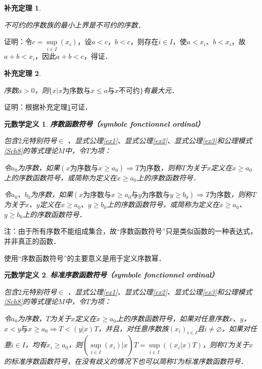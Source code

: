 \documentclass[12pt, a4paper, oneside]{book}
\newtheorem{metadef}{元数学定义}
\newtheorem{cor}{补充定理}
\begin{document}
			\begin{cor}\label{cor267}
				\hfill\par
				不可约的序数族的最小上界是不可约的序数．
			\end{cor}
			证明：令$c=\mathop{sup}\limits_{i\in I}(x_i)$，设$a<c$，$b<c$，则存在$i\in I$，使$a<x_i$、$b<x_i$，故$a+b<x_i$，因此$a+b<c$，得证．
			
			\begin{cor}\label{cor268}
				\hfill\par
				序数$a>0$，则$\{x|x\text{为序数}\text{与}x\leq a\text{与}x\text{不可约}\}$有最大元．
			\end{cor}
			证明：根据补充定理\ref{cor267}可证． 
									
			\begin{metadef}
				\textbf{序数函数符号（symbole fonctionnel ordinal）}
				\par
				包含$2$元特别符号$\in$ 、显式公理\ref{ex1}、显式公理\ref{ex2}、显式公理\ref{ex3}和公理模式\ref{Sch8}的等式理论$M$中，令$T$为项：
				\par
				令$a_0$为序数，如果$(x\text{为序数}\text{与}x\geq a_0)\Rightarrow T\text{为序数}$，则称$T$为关于$x$定义在$x\geq a_0$上的序数函数符号，或简称为定义在$x\geq a_0$上的序数函数符号．
				\par
				令$a_0$、$b_0$为序数，如果$(x\text{为序数}\text{与}x\geq a_0\text{与}y\text{为序数}\text{与}y\geq b_0)\Rightarrow T\text{为序数}$，则称$T$为关于$x$、$y$定义在$x\geq a_0$、$y\geq b_0$上的序数函数符号，或简称为定义在$x\geq a_0$、$y\geq b_0$上的序数函数符号．
			\end{metadef}
			注：由于所有序数不能组成集合，故“序数函数符号”只是类似函数的一种表达式，并非真正的函数．
			\par
			使用“序数函数符号”的主要意义是用于定义序数幂．
									
			\begin{metadef}
				\textbf{标准序数函数符号（symbole fonctionnel ordinal）}
				\par
				包含$2$元特别符号$\in$ 、显式公理\ref{ex1}、显式公理\ref{ex2}、显式公理\ref{ex3}和公理模式\ref{Sch8}的等式理论$M$中，令$T$为项：
				\par
				令$a_0$为序数，$T$为关于$x$定义在$x\geq a_0$上的序数函数符号，如果对任意序数$x$、$y$，$x<y\text{与}x\geq a_0\Rightarrow T<(y|x)T$，并且，对任意序数族$(x_i)_{i\in I}$且$i\neq \varnothing$，如果对任意$i\in I$，均有$x_i\geq a_0$，则$(\mathop{sup}\limits_{i\in I}(x_i)|x)T=\mathop{sup}\limits_{i\in I}((x_i|x)T)$，则称$T$为关于$x$的标准序数函数符号，在没有歧义的情况下也可以简称$T$为标准序数函数符号．
			\end{metadef}
			
\end{document}
